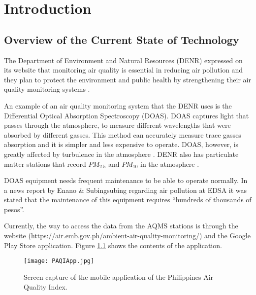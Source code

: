 \chapter{Introduction}
\label{sec:researchdesc}    %

\section{Overview of the Current State of Technology}
\label{sec:overview}
The Department of Environment and Natural Resources (DENR) expressed on its website that monitoring air quality is essential in reducing air pollution and they plan to protect the environment and public health by strengthening their air quality monitoring systems \cite{DENR2020}.

An example of an air quality monitoring system that the DENR uses is the Differential Optical Absorption Spectroscopy (DOAS)\cite{DENR_ND}. DOAS captures light that passes through the atmosphere, to measure different wavelengths that were absorbed by different gasses. This method can accurately measure trace gasses absorption and it is simpler and less expensive to operate. DOAS, however, is greatly affected by turbulence in the atmosphere \cite{PlattEtAl2008}. DENR also has particulate matter stations that record $PM_{2.5}$ and $PM_{10}$ in the atmosphere \cite{DENR_ND}.

DOAS equipment needs frequent maintenance to be able to operate normally. In a news report by Enano \& Subingsubing \citeyear{enano_subingsubing_2019} regarding air pollution at EDSA it was stated that the maintenance of this equipment requires “hundreds of thousands of pesos”.

Currently, the way to access the data from the AQMS stations is through the website (https://air.emb.gov.ph/ambient-air-quality-monitoring/) and the Google Play Store application. Figure \ref{fig:PAQIApp} shows the contents of the application.\\

  
\begin{figure}[!htbp]              %
   \centering                    %
   \texttt{[image: PAQIApp.jpg]}      %
   \caption{Screen capture of the mobile application of the Philippines Air Quality Index.
}
    \label{fig:PAQIApp}
\end{figure}
\FloatBarrier

